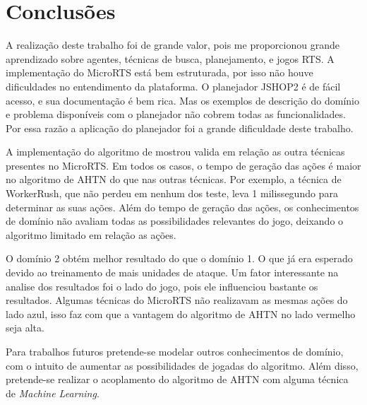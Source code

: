 
\chapter{\label{concl}Conclusões}

A realização deste trabalho foi de grande valor, pois me proporcionou grande aprendizado sobre agentes, técnicas de busca, planejamento, e jogos RTS.
A implementação do MicroRTS está bem estruturada, por isso não houve dificuldades no entendimento da plataforma.
O planejador JSHOP2 é de fácil acesso, e sua documentação é bem rica.
Mas os exemplos de descrição do domínio e problema disponíveis com o planejador não cobrem todas as funcionalidades.
Por essa razão a aplicação do planejador foi a grande dificuldade deste trabalho.

A implementação do algoritmo de mostrou valida em relação as outra técnicas presentes no MicroRTS.
Em todos os casos, o tempo de geração das ações é maior no algoritmo de AHTN do que nas outras técnicas.
Por exemplo, a técnica de WorkerRush, que não perdeu em nenhum dos teste, leva 1 milissegundo para determinar as suas ações.
Além do tempo de geração das ações, os conhecimentos de domínio não avaliam todas as possibilidades relevantes do jogo, deixando o algoritmo limitado em relação as ações.

O domínio 2 obtém melhor resultado do que o domínio 1.
O que já era esperado devido ao treinamento de mais unidades de ataque.
Um fator interessante na analise dos resultados foi o lado do jogo, pois ele influenciou bastante os resultados.
Algumas técnicas do MicroRTS não realizavam as mesmas ações do lado azul, isso faz com que a vantagem do algoritmo de AHTN no lado vermelho seja alta.


Para trabalhos futuros pretende-se modelar outros conhecimentos de domínio, com o intuito de aumentar as possibilidades de jogadas do algoritmo. 
Além disso, pretende-se realizar o acoplamento do algoritmo de AHTN com alguma técnica de \textit{Machine Learning}.

